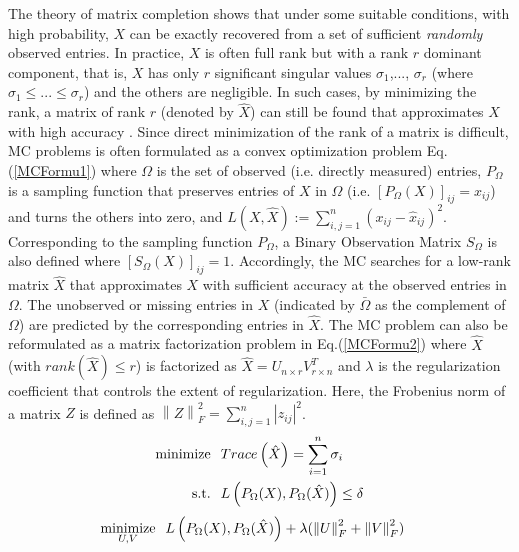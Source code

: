 The theory of matrix completion \cite{Candes:2009} shows that under some suitable conditions, with high probability, $X$ can be exactly recovered from a set of sufficient \emph{randomly} observed entries. In practice, $X$ is often full rank but
with a rank $r$ dominant component, that is, $X$ has only $r$ significant singular values $\sigma_{1}$,..., $\sigma_{r}$ (where $\sigma_{1} \leq ... \leq \sigma_{r}$) and the others are negligible. In such cases, by minimizing the rank, a matrix of rank $r$ (denoted by $\hat{X}$) can still be found that approximates $X$ with high accuracy \cite{YLiao:2011}\cite{Candes:2009}\cite{Keshavan:2009}. Since direct minimization of the rank of a matrix is difficult, MC problems is often formulated as a convex optimization problem Eq.(\ref{MCFormu1}) where $\Omega$ is the set of observed (i.e. directly measured) entries, $P_{\Omega}$ is a sampling function that preserves entries of $X$ in $\Omega$ (i.e. $[P_{\Omega}(X)]_{ij}=x_{ij}$) and turns the others into zero, and $L(X,\hat{X}):=\sum_{i,j=1}^{n} (x_{ij}-\hat{x}_{ij})^{2}$. Corresponding to the sampling function $P_{\Omega}$, a Binary Observation Matrix $S_{\Omega}$ is also defined where $[S_{\Omega}(X)]_{ij}=1$. Accordingly, the MC searches for a low-rank matrix $\hat{X}$ that approximates $X$ with sufficient accuracy at the observed entries in $\Omega$. The unobserved or missing entries in $X$ (indicated by $\bar{\Omega}$ as the complement of $\Omega$) are predicted by the corresponding entries in $\hat{X}$. The MC problem can also be reformulated as a matrix factorization problem in Eq.(\ref{MCFormu2}) where $\hat{X}$ (with $rank(\hat{X}) \leq r$) is factorized as $\hat{X}=U_{n \times r}V_{r \times n}^{T}$ and $\lambda$ is the regularization coefficient that controls the extent of regularization. Here, the Frobenius norm of a matrix $Z$ is defined as $\left\|Z\right\|_{F}^{2}=\sum_{i,j=1}^{n} \left|z_{ij}\right|^{2}$. 
\begin{equation}\label{MCFormu1}
\begin{aligned}
\text{minimize} & \hspace{0.25cm} Trace \left( \hat{X} \right) = \sum_{i=1}^{n} \sigma_{i} \\
\text{s.t.} &  \hspace{0.25cm}  L\left(P_{\Omega}(X),P_{\Omega}(\hat{X})\right) \leq \delta
\end{aligned}
\end{equation}
\begin{equation}\label{MCFormu2}
\begin{aligned}
\underset{U,V}{\text{minimize}} & \hspace{0.25cm} L\left(P_{\Omega}(X),P_{\Omega}(\hat{X})\right) + \lambda ( \left\|U\right\|_{F}^{2} + \left\|V\right\|_{F}^{2} ) 
\end{aligned}
\end{equation}

